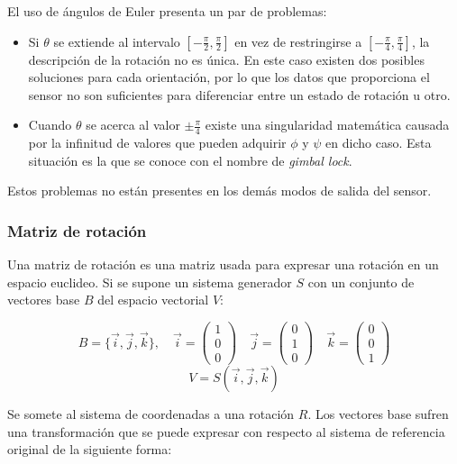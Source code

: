 \documentclass[10pt, a4paper]{report}
\begin{document}
El uso de ángulos de Euler presenta un par de problemas:

\begin{itemize}

\item Si $\theta$ se extiende al intervalo $[-\frac{\pi}{2}, \frac{\pi}{2}]$ en vez de restringirse a $[-\frac{\pi}{4}, \frac{\pi}{4}]$, la descripción de la rotación no es única. En este caso existen dos posibles soluciones para cada orientación, por lo que los datos que proporciona el sensor no son suficientes para diferenciar entre un estado de rotación u otro.

\item Cuando $\theta$ se acerca al valor $\pm\frac{\pi}{4}$ existe una singularidad matemática causada por la infinitud de valores que pueden adquirir $\phi$ y $\psi$ en dicho caso. Esta situación es la que se conoce con el nombre de \textit{gimbal lock}.

\end{itemize}

Estos problemas no están presentes en los demás modos de salida del sensor.

\subsubsection{Matriz de rotación}

Una matriz de rotación es una matriz usada para expresar una rotación en un espacio euclideo. Si se supone un sistema generador $S$ con un conjunto de vectores base $B$ del espacio vectorial $V$:

$$ B = \{\vec{i}, \vec{j}, \vec{k}\}, \quad \vec{i} = \left( \begin{smallmatrix} 1\\0\\0 \end{smallmatrix} \right) \quad  \vec{j} = \left( \begin{smallmatrix} 0\\1\\0 \end{smallmatrix} \right) \quad  \vec{k} = \left( \begin{smallmatrix} 0\\0\\1 \end{smallmatrix} \right)$$
$$ V = S(\vec{i}, \vec{j}, \vec{k}) $$

Se somete al sistema de coordenadas a una rotación $R$. Los vectores base sufren una transformación que se puede expresar con respecto al sistema de referencia original de la siguiente forma:
\end{document}
